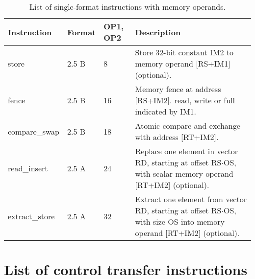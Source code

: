 \documentclass[forwardcom.tex]{subfiles}
\begin{document}
\begin{longtable} {|p{25mm}|p{14mm}|p{10mm}|p{95mm}|}
\caption{List of single-format instructions with memory operands.} 
\label{table:ListOfSingleFormatInstructionsMemory} \\
\endfirsthead
\endhead
\hline
\bfseries Instruction & \bfseries Format &\bfseries OP1, OP2 & \bfseries Description \\
\hline
store         & 2.5 B &  8 & Store 32-bit constant IM2 to memory operand [RS+IM1] (optional). \\

fence         & 2.5 B & 16 & Memory fence at address [RS+IM2]. read, write or full indicated by IM1.\\

compare\_swap & 2.5 B & 18 & Atomic compare and exchange with address [RT+IM2].\\

read\_insert  & 2.5 A & 24 & Replace one element in vector RD, starting at offset 
RS$\cdot$OS, with scalar memory operand [RT+IM2] (optional).  \\

extract\_store& 2.5 A & 32 & Extract one element from vector RD, starting at offset RS$\cdot$OS, with size OS into memory operand [RT+IM2] (optional). \\

\hline
\end{longtable}
\vspace{4mm}



\section{List of control transfer instructions}
\end{document}
